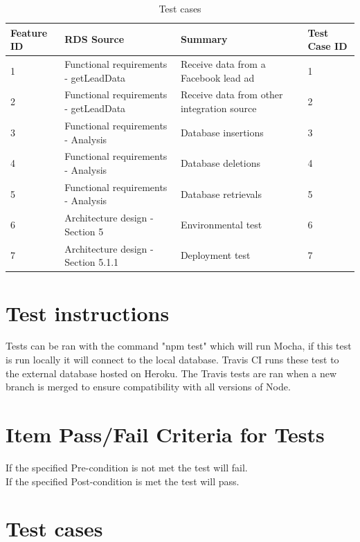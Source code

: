 \documentclass{article}
\begin{document}
\begin{table}[]
\centering
\caption{Test cases}
\label{test_table}
\begin{tabular}{|l|l|l|l|}
\hline
Feature ID & RDS Source                            & Summary                                    & Test Case ID \\ \hline \hline
1          & Functional requirements - getLeadData & Receive data from a Facebook lead ad       & 1            \\ \hline
2          & Functional requirements - getLeadData    & Receive data from other integration source & 2            \\ \hline
3          & Functional requirements - Analysis    & Database insertions                        & 3            \\ \hline
4          & Functional requirements - Analysis    & Database deletions                         & 4            \\ \hline
5          & Functional requirements - Analysis    & Database retrievals                        & 5            \\ \hline
6          &  Architecture design - Section 5      & Environmental test                         & 6            \\ \hline
7          &  Architecture design - Section 5.1.1  & Deployment test                            & 7            \\ \hline
\end{tabular}
\end{table}


\section{Test instructions} %
Tests can be ran with the command "npm test" which will run Mocha, if this test is run locally it will connect to the local database.
Travis CI runs these test to the external database hosted on Heroku. The Travis tests are ran when a new branch is merged to ensure compatibility with all versions of Node.
\section{Item Pass/Fail Criteria for Tests}
If the specified Pre-condition is not met the test will fail. \\
If the specified Post-condition is met the test will pass.
\cleardoublepage
\section{Test cases}
\end{document}
